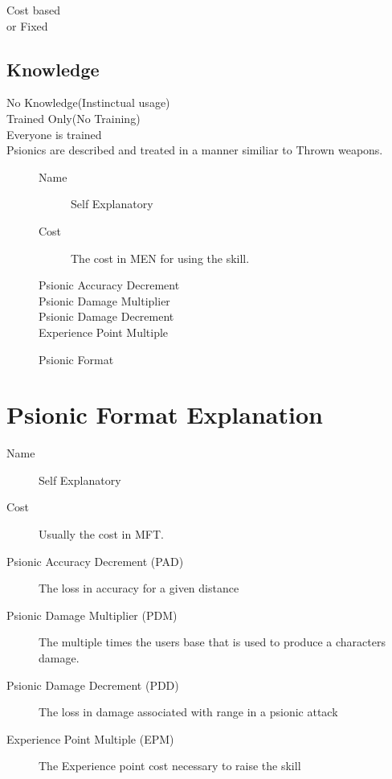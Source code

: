 Cost based \\
or Fixed\\

\subsection{Knowledge}

No Knowledge(Instinctual usage) \\
Trained Only(No Training) \\
Everyone is trained \\

Psionics are described and treated in a manner similiar to Thrown weapons.

\begin{figure}[hb]
\centering
\caption{Psionic Format}
	\begin{description}
	\item[Name] Self Explanatory
	\item[Cost] The cost in MEN for using the skill.
	\item[Psionic Accuracy Decrement] 
	\item[Psionic Damage Multiplier]
	\item[Psionic Damage Decrement]
	\item[Experience Point Multiple]
	\end{description}
\end{figure}

\section{Psionic For\-mat Ex\-pla\-nation}

\begin{description}
	\item[Name]
	Self Explanatory
	\item[Cost]
	Usually the cost in MFT.
	\item[Psionic Accuracy Decrement (PAD)]
	The loss in accuracy for a given distance
	\item[Psionic Damage Multiplier (PDM)]
	The multiple times the users base that is used to produce a characters
	damage.
	\item[Psionic Damage Decrement (PDD)]
	The loss in dam\-age as\-so\-ciated with range in a psionic attack
	\item[Experience Point Multiple (EPM)]
	The Experience point cost necessary to raise the skill
\end{description}

